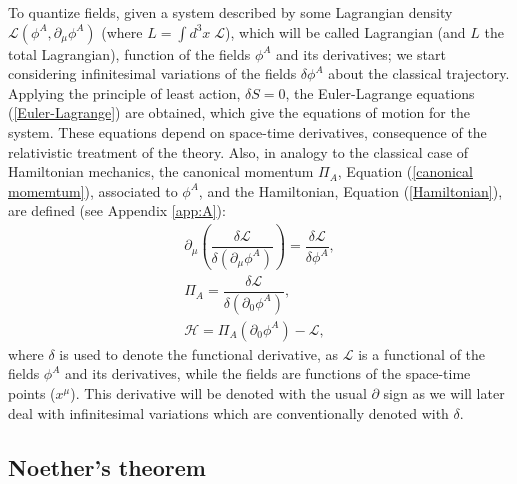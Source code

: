 To quantize fields, given a system described by some Lagrangian density $\mathcal{L}(\phi^A, \partial_{\mu}\phi^A)$ (where $L = \int d^3x \; \mathcal{L}$),  which will be called Lagrangian (and $L$ the total Lagrangian), function of the fields $\phi^A$ and its derivatives; we start considering infinitesimal variations of the fields $\delta \phi^A$ about the classical trajectory. Applying the principle of least action, $\delta S = 0$, the Euler-Lagrange equations (\ref{Euler-Lagrange}) are obtained, which give the equations of motion for the system. These equations depend on space-time derivatives, consequence of the relativistic treatment of the theory. Also, in analogy to the classical case of Hamiltonian mechanics, the canonical momentum $\Pi_A$, Equation (\ref{canonical momemtum}), associated to $\phi^A$, and the Hamiltonian, Equation (\ref{Hamiltonian}), are defined (see Appendix \ref{app:A}):
\begin{gather} 
\label{Euler-Lagrange}
    \partial_{\mu}\left(\dfrac{\delta\mathcal{L}}{\delta(\partial_{\mu}\phi^A)}\right) = \dfrac{\delta\mathcal{L}}{\delta\phi^A}, \\
\label{canonical momemtum}
    \Pi_A = \dfrac{\delta\mathcal{L}}{\delta(\partial_{0}\phi^A)}, \\
\label{Hamiltonian}
    \mathcal{H} = \Pi_A(\partial_0\phi^A) - \mathcal{L},
\end{gather}
where $\delta$ is used to denote the functional derivative, as $\mathcal{L}$ is a functional of the fields $\phi^A$ and its derivatives, while the fields are functions of the space-time points ($x^{\mu}$). This derivative will be denoted with the usual $\partial$ sign as we will later deal with infinitesimal variations which are conventionally denoted with $\delta$.

\subsection{Noether's theorem} \label{ssec:noethertheorem}

